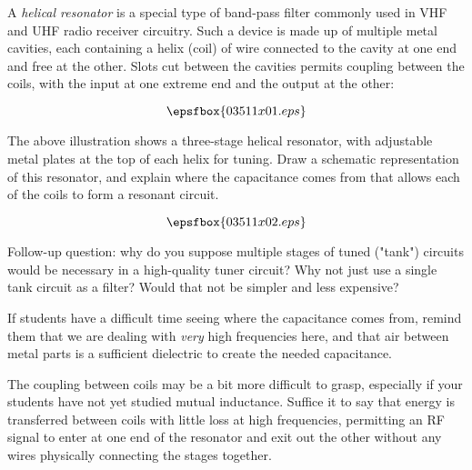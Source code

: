 

A {\it helical resonator} is a special type of band-pass filter commonly used in VHF and UHF radio receiver circuitry.  Such a device is made up of multiple metal cavities, each containing a helix (coil) of wire connected to the cavity at one end and free at the other.  Slots cut between the cavities permits coupling between the coils, with the input at one extreme end and the output at the other:

$$\epsfbox{03511x01.eps}$$

The above illustration shows a three-stage helical resonator, with adjustable metal plates at the top of each helix for tuning.  Draw a schematic representation of this resonator, and explain where the capacitance comes from that allows each of the coils to form a resonant circuit.







$$\epsfbox{03511x02.eps}$$

\vskip 10pt

Follow-up question: why do you suppose multiple stages of tuned ("tank") circuits would be necessary in a high-quality tuner circuit?  Why not just use a single tank circuit as a filter?  Would that not be simpler and less expensive?







If students have a difficult time seeing where the capacitance comes from, remind them that we are dealing with {\it very} high frequencies here, and that air between metal parts is a sufficient dielectric to create the needed capacitance.

The coupling between coils may be a bit more difficult to grasp, especially if your students have not yet studied mutual inductance.  Suffice it to say that energy is transferred between coils with little loss at high frequencies, permitting an RF signal to enter at one end of the resonator and exit out the other without any wires physically connecting the stages together.




